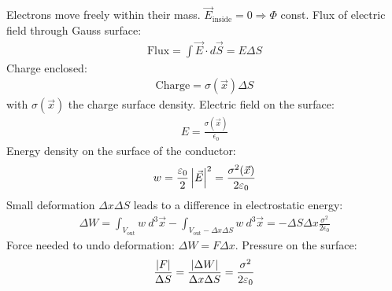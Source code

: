 Electrons move freely within their mass. $\vec{E}_{\text{inside}} = 0
\Rightarrow \Phi$ const. Flux of electric field through Gauss surface:
\begin{align*}
    \text{Flux} = \int \vec{E} \cdot d \vec{S} = E \Delta S
\end{align*}
Charge enclosed:
\begin{align*}
    \text{Charge} = \sigma(\vec{x}) \Delta S
\end{align*}
with $\sigma(\vec{x})$ the charge surface density. Electric field on the
surface:
\begin{align*}
    E = \frac{\sigma(\vec{x})}{\epsilon_0}
\end{align*}
Energy density on the surface of the conductor:
\begin{align*}
    w = \frac{\varepsilon_0}{2} \left\vert \vec{E} \right\vert^2
    = \frac{\sigma^2(\vec{x})}{2 \varepsilon_0}
\end{align*}
Small deformation $\Delta x \Delta S$ leads to a difference in electrostatic
energy:
\begin{align*}
    \Delta W = \int_{V_{\text{out}}} w \ d^3 \vec{x} - \int_{V_{\text{out}} - \Delta x \Delta S} w \ d^3 \vec{x}
    = - \Delta S \Delta x \frac{\sigma^2}{2 \epsilon_0}
\end{align*}
Force needed to undo deformation: $\Delta W = F \Delta x$. Pressure on the
surface:
\begin{align*}
    \frac{\left\vert F \right\vert}{\Delta S} = \frac{\left\vert \Delta W \right\vert}{\Delta x \Delta S}
    = \frac{\sigma^2}{2 \varepsilon_0}
\end{align*}
